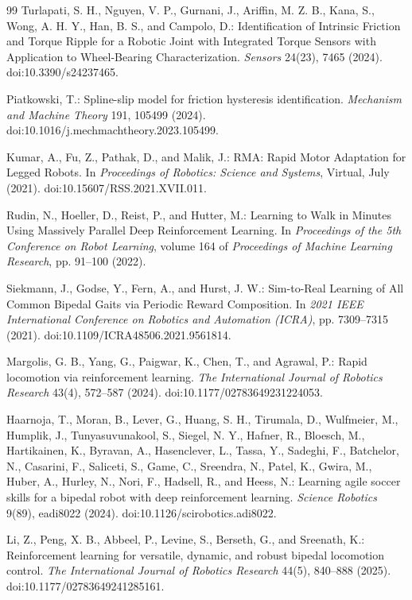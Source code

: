 \documentclass[twoside,final,1p,times]{elsarticle}
\begin{document}
\begin{thebibliography}{99}
Turlapati, S. H., Nguyen, V. P., Gurnani, J., Ariffin, M. Z. B., Kana, S., Wong, A. H. Y., Han, B. S., and Campolo, D.: Identification of Intrinsic Friction and Torque Ripple for a Robotic Joint with Integrated Torque Sensors with Application to Wheel-Bearing Characterization.
\emph{Sensors} 24(23), 7465 (2024). doi:10.3390/s24237465.

Piatkowski, T.: Spline-slip model for friction hysteresis identification.
\emph{Mechanism and Machine Theory} 191, 105499 (2024). doi:10.1016/j.mechmachtheory.2023.105499.

Kumar, A., Fu, Z., Pathak, D., and Malik, J.: RMA: Rapid Motor Adaptation for Legged Robots.
In \emph{Proceedings of Robotics: Science and Systems}, Virtual, July (2021). doi:10.15607/RSS.2021.XVII.011.

Rudin, N., Hoeller, D., Reist, P., and Hutter, M.: Learning to Walk in Minutes Using Massively Parallel Deep Reinforcement Learning.
In \emph{Proceedings of the 5th Conference on Robot Learning}, volume 164 of \emph{Proceedings of Machine Learning Research}, pp. 91--100 (2022).

Siekmann, J., Godse, Y., Fern, A., and Hurst, J. W.: Sim-to-Real Learning of All Common Bipedal Gaits via Periodic Reward Composition.
In \emph{2021 IEEE International Conference on Robotics and Automation (ICRA)}, pp. 7309--7315 (2021). doi:10.1109/ICRA48506.2021.9561814.

Margolis, G. B., Yang, G., Paigwar, K., Chen, T., and Agrawal, P.: Rapid locomotion via reinforcement learning.
\emph{The International Journal of Robotics Research} 43(4), 572--587 (2024). doi:10.1177/02783649231224053.

Haarnoja, T., Moran, B., Lever, G., Huang, S. H., Tirumala, D., Wulfmeier, M., Humplik, J., Tunyasuvunakool, S., Siegel, N. Y., Hafner, R., Bloesch, M., Hartikainen, K., Byravan, A., Hasenclever, L., Tassa, Y., Sadeghi, F., Batchelor, N., Casarini, F., Saliceti, S., Game, C., Sreendra, N., Patel, K., Gwira, M., Huber, A., Hurley, N., Nori, F., Hadsell, R., and Heess, N.: Learning agile soccer skills for a bipedal robot with deep reinforcement learning.
\emph{Science Robotics} 9(89), eadi8022 (2024). doi:10.1126/scirobotics.adi8022.

Li, Z., Peng, X. B., Abbeel, P., Levine, S., Berseth, G., and Sreenath, K.: Reinforcement learning for versatile, dynamic, and robust bipedal locomotion control.
\emph{The International Journal of Robotics Research} 44(5), 840--888 (2025). doi:10.1177/02783649241285161.


\end{thebibliography}
\end{document}
